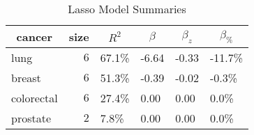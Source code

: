 \begin{table}[!tbp]
\caption{Lasso Model Summaries\label{tab:lasso}} 
\begin{center}
\begin{tabular}{lrllll}
\hline\hline
\multicolumn{1}{c}{cancer}&\multicolumn{1}{c}{size}&\multicolumn{1}{c}{$R^2$}&\multicolumn{1}{c}{$\beta$}&\multicolumn{1}{c}{$\beta_z$}&\multicolumn{1}{c}{$\beta_{\%}$}\tabularnewline
\hline
lung&$6$&67.1\%&-6.64&-0.33&-11.7\%\tabularnewline
breast&$6$&51.3\%&-0.39&-0.02&-0.3\%\tabularnewline
colorectal&$6$&27.4\%&0.00&0.00&0.0\%\tabularnewline
prostate&$2$&7.8\%&0.00&0.00&0.0\%\tabularnewline
\hline
\end{tabular}\end{center}

\end{table}
